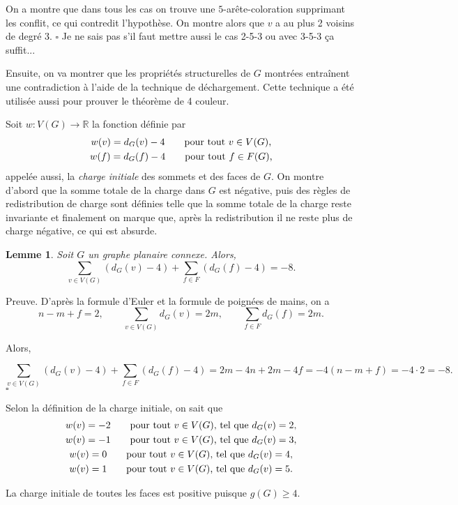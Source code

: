 \documentclass[10pt,a4paper]{article}
\newtheorem{lemme}{Lemme}
\newcommand{\ep}{{\hfill $\square$}}
\begin{document}
On a montre que dans tous les cas on trouve une $5$-arête-coloration supprimant les conflit, ce qui contredit l'hypothèse. On montre alors que $v$ a au plus 2 voisins de degré 3.
\ep
{\color{red} Je ne sais pas s'il faut mettre aussi le cas 2-5-3 ou avec 3-5-3 ça suffit...}

\bigskip
Ensuite, on va montrer que les propriétés structurelles de $G$ montrées entraînent une contradiction à l'aide de la technique de déchargement. Cette technique a été utilisée aussi pour prouver le théorème de 4 couleur. 

Soit $w: V(G) \to \mathbb{R}$  la fonction définie par
 $$
 \gathered
 w(v) = d_G(v) - 4 \qquad \textrm{pour tout $v\in V(G)$,} \\
 w(f) = d_G(f) - 4 \qquad \textrm{pour tout $f\in F(G)$,} 
\endgathered 
$$
appelée aussi, la \emph{charge initiale} des sommets et des faces de $G$. On montre d'abord que la somme totale de la charge dans $G$ est négative, puis des règles de redistribution de charge sont définies telle que la somme totale de la charge reste invariante et finalement on marque que, après la redistribution il ne reste plus de charge négative, ce qui est absurde.

\begin{lemme}
Soit $G$ un graphe planaire connexe. Alors,
$$ \sum_{v \in V(G)} (d_G(v) - 4) + \sum_{f\in F} (d_G(f) -4) = -8.$$
\end{lemme}

Preuve.
D'après la formule d'Euler et la formule de poignées de mains, on a
$$ 
n - m + f = 2, \qquad
\sum_{v\in V(G)} d_G(v) = 2m, \qquad
\sum_{f\in F} d_G(f) = 2m. 
$$

Alors,

$$ \sum_{v \in V(G)} (d_G(v) - 4) + \sum_{f\in F} (d_G(f) -4) = 2m -4n + 2m - 4f = -4(n - m + f) = -4\cdot 2 = -8.$$
\ep 

Selon la définition de la charge initiale, on sait que
$$ 
\gathered
w(v) = -2 \qquad \textrm{pour tout $v \in V(G)$, tel que } d_G(v) = 2, \\
w(v) = -1 \qquad \textrm{pour tout $v \in V(G)$, tel que } d_G(v) = 3, \\
w(v) =  0 \qquad \textrm{pour tout $v \in V(G)$, tel que } d_G(v) = 4, \\
w(v) =  1 \qquad \textrm{pour tout $v \in V(G)$, tel que } d_G(v) = 5.
\endgathered
$$

La charge initiale de toutes les faces est positive puisque $g(G)\ge 4$.
\end{document}
